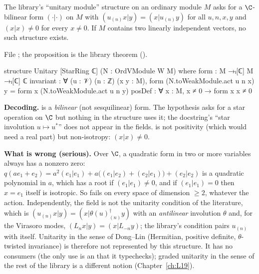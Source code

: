 \begin{proposition}\label{l12:prop:unitary}
The library's ``unitary module'' structure on an ordinary module $M$ asks for a $\C$-bilinear form $(\cdot|\cdot)$ on $M$
with $(u_{(n)}x|y) = (x|u_{(n)}y)$ for all $u,n,x,y$ and $(x|x)\neq0$ for every $x\neq0$. If $M$ contains two linearly
independent vectors, no such structure exists.
\end{proposition}
\noindent File ; the proposition is the library theorem
\allowbreak{}\allowbreak{}\allowbreak{} ().
\begin{leancode}
structure Unitary [StarRing ℂ] (N : OrdVModule W M) where
  form : M →ₗ[ℂ] M →ₗ[ℂ] ℂ
  invariant : ∀ (u : 𝒱) (n : ℤ) (x y : M),
    form (N.toWeakModule.act u n x) y = form x (N.toWeakModule.act u n y)
  posDef : ∀ x : M, x ≠ 0 → form x x ≠ 0
\end{leancode}

\begin{dictionary}
\textbf{Decoding.}  is a \emph{bilinear} (not sesquilinear) form. The hypothesis
\lean{[StarRing ℂ]} asks for a star operation on $\C$ but nothing in the structure uses it; the docstring's ``star
involution $u\mapsto u^*$'' does not appear in the fields.  is not positivity (which would need a real
part) but non-isotropy: $(x|x)\neq0$.

\textbf{What is wrong (serious).} Over $\C$, a quadratic form in two or more variables always has a nonzero zero:
$q(ae_1+e_2) = a^2(e_1|e_1) + a\big((e_1|e_2)+(e_2|e_1)\big) + (e_2|e_2)$ is a quadratic polynomial in $a$, which has a
root if $(e_1|e_1)\neq0$, and if $(e_1|e_1) = 0$ then $x = e_1$ itself is isotropic. So  fails on every
space of dimension $\ge2$, whatever the action. Independently, the  field is not the unitarity
condition of the literature, which is $(u_{(n)}x|y) = (x|\theta(u)^\dagger_{(n)}y)$ with an \emph{antilinear}
involution $\theta$ and, for the Virasoro modes, $(L_nx|y) = (x|L_{-n}y)$; the library's condition pairs $u_{(n)}$
with itself. Unitarity in the sense of Dong--Lin (Hermitian, positive definite, $\theta$-twisted invariance) is
therefore not represented by this structure. It has no consumers (the only use is an  that it
typechecks); graded unitarity in the sense of the rest of the library is a different notion
(Chapter~\ref{ch:L19}).
\end{dictionary}

